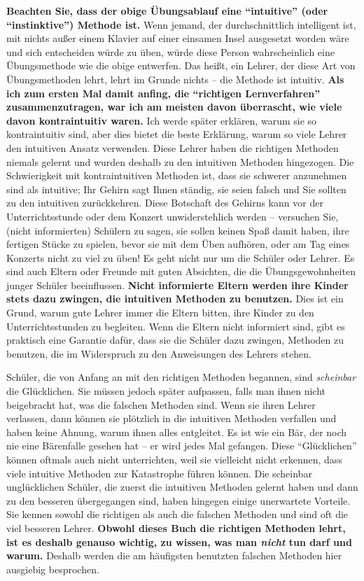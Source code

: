 \textbf{Beachten Sie, dass der obige Übungsablauf eine \enquote{intuitive} (oder \enquote{instinktive}) Methode ist.}
Wenn jemand, der durchschnittlich intelligent ist, mit nichts außer einem Klavier auf einer einsamen Insel ausgesetzt worden wäre und sich entscheiden würde zu üben, würde diese Person wahrscheinlich eine Übungsmethode wie die obige entwerfen.
Das heißt, ein Lehrer, der diese Art von Übungsmethoden lehrt, lehrt im Grunde nichts -- die Methode ist intuitiv.
\textbf{Als ich zum ersten Mal damit anfing, die \enquote{richtigen Lernverfahren} zusammenzutragen, war ich am meisten davon überrascht, wie viele davon kontraintuitiv waren.}
Ich werde später erklären, warum sie so kontraintuitiv sind, aber dies bietet die beste Erklärung, warum so viele Lehrer den intuitiven Ansatz verwenden.
Diese Lehrer haben die richtigen Methoden niemals gelernt und wurden deshalb zu den intuitiven Methoden hingezogen.
Die Schwierigkeit mit kontraintuitiven Methoden ist, dass sie schwerer anzunehmen sind als intuitive; Ihr Gehirn sagt Ihnen ständig, sie seien falsch und Sie sollten zu den intuitiven zurückkehren.
Diese Botschaft des Gehirns kann vor der Unterrichtsstunde oder dem Konzert unwiderstehlich werden -- versuchen Sie, (nicht informierten) Schülern zu sagen, sie sollen keinen Spaß damit haben, ihre fertigen Stücke zu spielen, bevor sie mit dem Üben aufhören, oder am Tag eines Konzerts nicht zu viel zu üben!
Es geht nicht nur um die Schüler oder Lehrer.
Es sind auch Eltern oder Freunde mit guten Absichten, die die Übungsgewohnheiten junger Schüler beeinflussen.
\textbf{Nicht informierte Eltern werden ihre Kinder stets dazu zwingen, die intuitiven Methoden zu benutzen.}
Dies ist ein Grund, warum gute Lehrer immer die Eltern bitten, ihre Kinder zu den Unterrichtsstunden zu begleiten.
Wenn die Eltern nicht informiert sind, gibt es praktisch eine Garantie dafür, dass sie die Schüler dazu zwingen, Methoden zu benutzen, die im Widerspruch zu den Anweisungen des Lehrers stehen.

Schüler, die von Anfang an mit den richtigen Methoden begannen, sind \textit{scheinbar} die Glücklichen.
Sie müssen jedoch später aufpassen, falls man ihnen nicht beigebracht hat, was die falschen Methoden sind.
Wenn sie ihren Lehrer verlassen, dann können sie plötzlich in die intuitiven Methoden verfallen und haben keine Ahnung, warum ihnen alles entgleitet.
Es ist wie ein Bär, der noch nie eine Bärenfalle gesehen hat -- er wird jedes Mal gefangen.
Diese \enquote{Glücklichen} können oftmals auch nicht unterrichten, weil sie vielleicht nicht erkennen, dass viele intuitive Methoden zur Katastrophe führen können.
Die scheinbar unglücklichen Schüler, die zuerst die intuitiven Methoden gelernt haben und dann zu den besseren übergegangen sind, haben hingegen einige unerwartete Vorteile.
Sie kennen sowohl die richtigen als auch die falschen Methoden und sind oft die viel besseren Lehrer.
\textbf{Obwohl dieses Buch die richtigen Methoden lehrt, ist es deshalb genauso wichtig, zu wissen, was man \textit{nicht} tun darf und warum.}
Deshalb werden die am häufigsten benutzten falschen Methoden hier ausgiebig besprochen.

